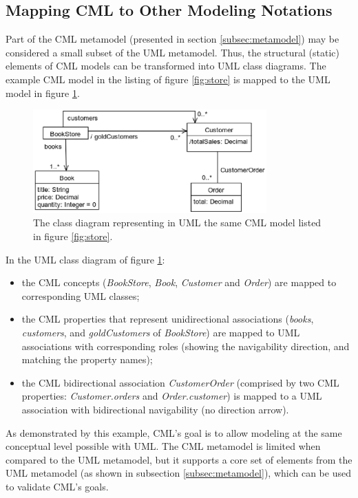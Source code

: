 \subsection{Mapping CML to Other Modeling Notations}\label{subsec:mapping}

Part of the CML metamodel (presented in section \ref{subsec:metamodel}) may be considered a small subset of the UML  \cite{uml} metamodel.
Thus, the structural (static) elements of CML models can be transformed into UML class diagrams. The example CML model in the listing of figure \ref{fig:store} is mapped to the UML model in figure \ref{fig:uml}.

\begin{figure}
\centering
\includegraphics[width=0.8\textwidth]{language/diagram-uml}
\caption{The class diagram representing in UML  \cite{uml} the same CML model listed in figure \ref{fig:store}.}
\label{fig:uml}
\end{figure}

In the UML class diagram of figure \ref{fig:uml}:
\begin{itemize}
\item the CML concepts (\emph{BookStore}, \emph{Book}, \emph{Customer} and \emph{Order}) are mapped to corresponding UML classes;
\item the CML properties that represent unidirectional associations
(\emph{books}, \emph{customers}, and \emph{goldCustomers} of \emph{BookStore})
are mapped to UML associations with corresponding roles
(showing the navigability direction, and matching the property names);
\item the CML bidirectional association \emph{CustomerOrder}
(comprised by two CML properties: \emph{Customer.orders} and \emph{Order.customer})
is mapped to a UML association with bidirectional navigability (no direction arrow).
\end{itemize}

As demonstrated by this example, CML's goal is to allow modeling at the same conceptual level possible with UML.
The CML metamodel is limited when compared to the UML metamodel, but it supports a core set of elements from the UML metamodel (as shown in subsection \ref{subsec:metamodel}), which can be used to validate CML's goals.



 